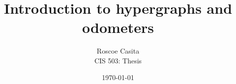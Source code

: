 \documentclass[10pt]{article}
\title{Introduction to hypergraphs and odometers}
\author{
        Roscoe Casita \\
        CIS 503: Thesis\\
}
\date{\today}
\begin{document}
\maketitle







\nocite{*}

\end{document}
